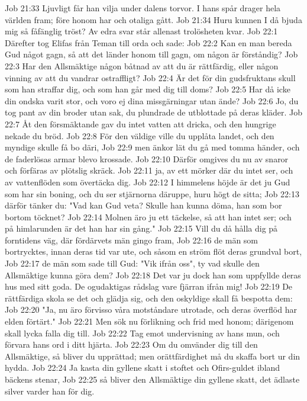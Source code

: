 Job 21:33  Ljuvligt får han vilja under dalens torvor. I hans spår drager hela världen fram; före honom har och otaliga gått.
Job 21:34  Huru kunnen I då bjuda mig så fåfänglig tröst? Av edra svar står allenast trolösheten kvar.
Job 22:1  Därefter tog Elifas från Teman till orda och sade:
Job 22:2  Kan en man bereda Gud något gagn, så att det länder honom till gagn, om någon är förståndig?
Job 22:3  Har den Allsmäktige någon båtnad av att du är rättfärdig, eller någon vinning av att du vandrar ostraffligt?
Job 22:4  Är det för din gudsfruktans skull som han straffar dig, och som han går med dig till doms?
Job 22:5  Har då icke din ondska varit stor, och voro ej dina missgärningar utan ände?
Job 22:6  Jo, du tog pant av din broder utan sak, du plundrade de utblottade på deras kläder.
Job 22:7  Åt den försmäktande gav du intet vatten att dricka, och den hungrige nekade du bröd.
Job 22:8  För den väldige ville du upplåta landet, och den myndige skulle få bo däri,
Job 22:9  men änkor lät du gå med tomma händer, och de faderlösas armar blevo krossade.
Job 22:10  Därför omgives du nu av snaror och förfäras av plötslig skräck.
Job 22:11  ja, av ett mörker där du intet ser, och av vattenflöden som övertäcka dig.
Job 22:12  I himmelens höjde är det ju Gud som har sin boning, och du ser stjärnorna däruppe, huru högt de sitta;
Job 22:13  därför tänker du: "Vad kan Gud veta? Skulle han kunna döma, han som bor bortom töcknet?
Job 22:14  Molnen äro ju ett täckelse, så att han intet ser; och på himlarunden är det han har sin gång."
Job 22:15  Vill du då hålla dig på forntidens väg, där fördärvets män gingo fram,
Job 22:16  de män som bortrycktes, innan deras tid var ute, och såsom en ström flöt deras grundval bort,
Job 22:17  de män som sade till Gud: "Vik ifrån oss", ty vad skulle den Allsmäktige kunna göra dem?
Job 22:18  Det var ju dock han som uppfyllde deras hus med sitt goda. De ogudaktigas rådslag vare fjärran ifrån mig!
Job 22:19  De rättfärdiga skola se det och glädja sig, och den oskyldige skall få bespotta dem:
Job 22:20  "Ja, nu äro förvisso våra motståndare utrotade, och deras överflöd har elden förtärt."
Job 22:21  Men sök nu förlikning och frid med honom; därigenom skall lycka falla dig till.
Job 22:22  Tag emot undervisning av hans mun, och förvara hans ord i ditt hjärta.
Job 22:23  Om du omvänder dig till den Allsmäktige, så bliver du upprättad; men orättfärdighet må du skaffa bort ur din hydda.
Job 22:24  Ja kasta din gyllene skatt i stoftet och Ofirs-guldet ibland bäckens stenar,
Job 22:25  så bliver den Allsmäktige din gyllene skatt, det ädlaste silver varder han för dig.
